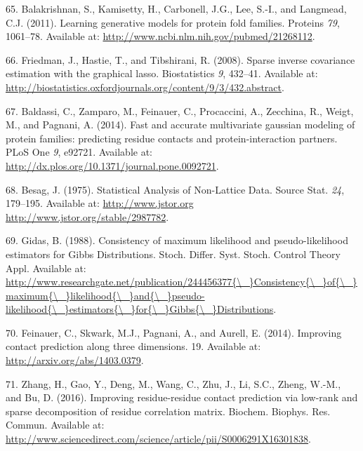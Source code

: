 \documentclass[12pt,a4paper,twoside]{book}
\theoremstyle{definition}
\theoremstyle{definition}
\theoremstyle{remark}
\begin{document}
\hypertarget{ref-Balakrishnan2011}{}
65. Balakrishnan, S., Kamisetty, H., Carbonell, J.G., Lee, S.-I., and
Langmead, C.J. (2011). Learning generative models for protein fold
families. Proteins \emph{79}, 1061--78. Available at:
\url{http://www.ncbi.nlm.nih.gov/pubmed/21268112}.

\hypertarget{ref-Friedman2008}{}
66. Friedman, J., Hastie, T., and Tibshirani, R. (2008). Sparse inverse
covariance estimation with the graphical lasso. Biostatistics \emph{9},
432--41. Available at:
\url{http://biostatistics.oxfordjournals.org/content/9/3/432.abstract}.

\hypertarget{ref-Baldassi2014}{}
67. Baldassi, C., Zamparo, M., Feinauer, C., Procaccini, A., Zecchina,
R., Weigt, M., and Pagnani, A. (2014). Fast and accurate multivariate
gaussian modeling of protein families: predicting residue contacts and
protein-interaction partners. PLoS One \emph{9}, e92721. Available at:
\url{http://dx.plos.org/10.1371/journal.pone.0092721}.

\hypertarget{ref-Besag1975}{}
68. Besag, J. (1975). Statistical Analysis of Non-Lattice Data. Source
Stat. \emph{24}, 179--195. Available at:
\href{http://www.jstor.org\%20http://www.jstor.org/stable/2987782}{http://www.jstor.org http://www.jstor.org/stable/2987782}.

\hypertarget{ref-Gidas1988}{}
69. Gidas, B. (1988). Consistency of maximum likelihood and
pseudo-likelihood estimators for Gibbs Distributions. Stoch. Differ.
Syst. Stoch. Control Theory Appl. Available at:
\href{http://www.researchgate.net/publication/244456377\%7B/_\%7DConsistency\%7B/_\%7Dof\%7B/_\%7Dmaximum\%7B/_\%7Dlikelihood\%7B/_\%7Dand\%7B/_\%7Dpseudo-likelihood\%7B/_\%7Destimators\%7B/_\%7Dfor\%7B/_\%7DGibbs\%7B/_\%7DDistributions}{http://www.researchgate.net/publication/244456377\{\textbackslash{}\_\}Consistency\{\textbackslash{}\_\}of\{\textbackslash{}\_\}maximum\{\textbackslash{}\_\}likelihood\{\textbackslash{}\_\}and\{\textbackslash{}\_\}pseudo-likelihood\{\textbackslash{}\_\}estimators\{\textbackslash{}\_\}for\{\textbackslash{}\_\}Gibbs\{\textbackslash{}\_\}Distributions}.

\hypertarget{ref-Feinauer2014}{}
70. Feinauer, C., Skwark, M.J., Pagnani, A., and Aurell, E. (2014).
Improving contact prediction along three dimensions. 19. Available at:
\url{http://arxiv.org/abs/1403.0379}.

\hypertarget{ref-Zhang2016}{}
71. Zhang, H., Gao, Y., Deng, M., Wang, C., Zhu, J., Li, S.C., Zheng,
W.-M., and Bu, D. (2016). Improving residue-residue contact prediction
via low-rank and sparse decomposition of residue correlation matrix.
Biochem. Biophys. Res. Commun. Available at:
\url{http://www.sciencedirect.com/science/article/pii/S0006291X16301838}.
\end{document}
